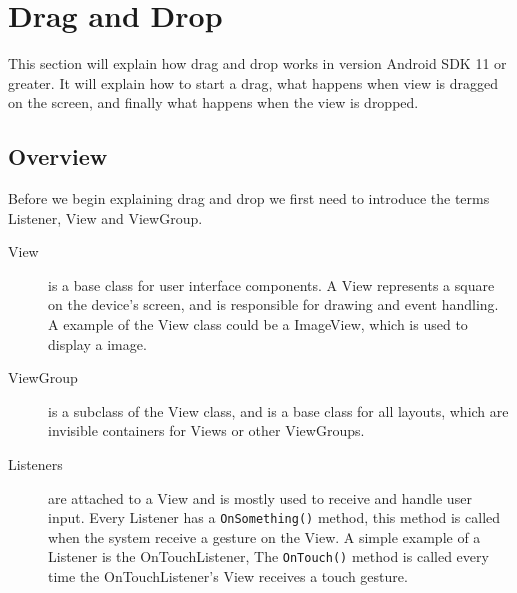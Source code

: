 \section{Drag and Drop}
\label{sec:androiddraganddrop}
This section will explain how drag and drop works in version Android SDK 11 or greater\citep{androiddraganddropguide}. It will explain how to start a drag, what happens when view is dragged on the screen, and finally what happens when the view is dropped.
\subsection*{Overview}
Before we begin explaining drag and drop we first need to introduce the terms Listener, View and ViewGroup.
\begin{description}
\item[View] is a base class for user interface components. A View represents a square on the device's screen, and is responsible for drawing and event handling. A example of the View class could be a ImageView, which is used to display a image.

\item[ViewGroup] is a subclass of the View class, and is a base class for all layouts, which are invisible containers for Views or other ViewGroups.

\item[Listeners] are attached to a View and is mostly used to receive and handle user input. Every Listener has a \lstinline|OnSomething()| method, this method is called when the system receive a gesture on the View. A simple example of a Listener is the OnTouchListener, The \lstinline|OnTouch()| method is called every time the OnTouchListener's View receives a touch gesture.
\end{description}

